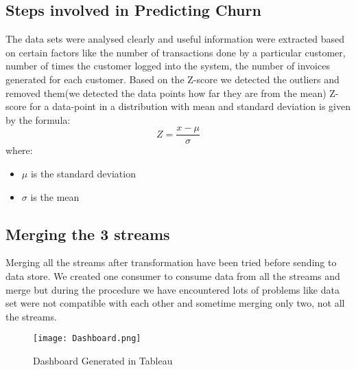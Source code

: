 \documentclass{article}
\begin{document}
\subsection{Steps involved in Predicting Churn}
The data sets were analysed clearly and useful information were extracted based on certain factors like the number of transactions done by a particular customer, number of times the customer logged into the system, the number of invoices generated for each customer. Based on the Z-score we detected the outliers and removed them(we detected the data points how far they are from the mean) Z-score for a data-point in a distribution with mean and standard deviation is given by the formula: 
\begin{equation}
    Z = \frac{x-\mu}{\sigma}
\end{equation}
where:
\begin{itemize}
    \item $\mu$ is the standard deviation
    \item $\sigma$ is the mean
\end{itemize}


    

\subsection{Merging the 3 streams}
Merging all the streams after transformation have been tried before sending to data store. We created one consumer to consume data from all the streams and merge but during the procedure we have encountered lots of problems like data set were not compatible with each other and sometime merging only two, not all the streams.

\begin{figure}[h!]
   \centering
     \texttt{[image: Dashboard.png]}
     \caption{Dashboard Generated in Tableau}
     \label{fig:universe}
\end{figure}
\end{document}
